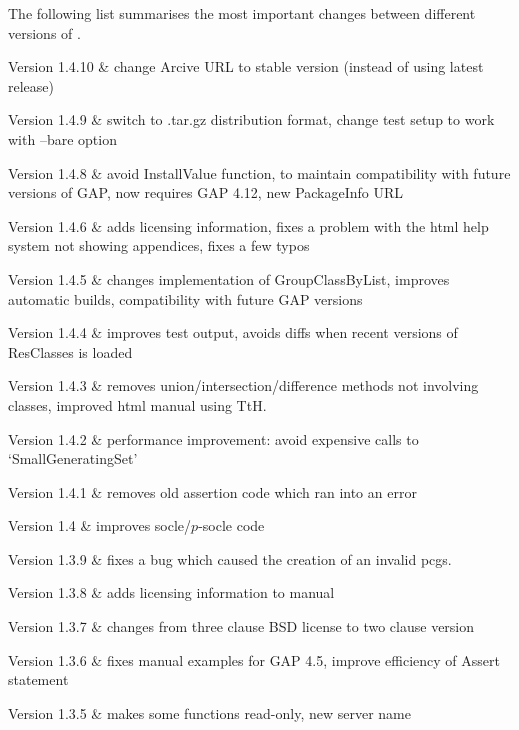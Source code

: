 
The following list summarises the most important changes between different versions of \CRISP.

\beginitems



Version 1.4.10 &
	change Arcive URL to stable version (instead of using latest release)

Version 1.4.9 &
	switch to .tar.gz distribution format, change test setup to work with --bare option

Version 1.4.8 &
	avoid InstallValue function, to maintain compatibility with future versions of GAP, now requires GAP 4.12, new PackageInfo URL

Version 1.4.6 &
	adds licensing information, fixes a problem with the html help system not showing appendices, fixes a few typos
	
Version 1.4.5 &
	changes implementation of GroupClassByList, improves automatic builds, compatibility with future GAP versions
	
Version  1.4.4 &
	improves test output, avoids diffs when recent versions of ResClasses is loaded

Version 1.4.3 &
	removes union/intersection/difference methods not involving classes, improved html manual using TtH.

Version 1.4.2 & 
	performance improvement: avoid expensive calls to `SmallGeneratingSet'
	
Version 1.4.1 &
	removes old assertion code which ran into an error
	
Version 1.4 &
	improves socle/$p$-socle code
	
Version 1.3.9 &
	fixes a bug which caused the creation of an invalid pcgs.
	
Version 1.3.8 &
	adds licensing information to manual
	
Version 1.3.7 &
	changes from three clause BSD license to two clause version
	
Version 1.3.6 & 
	fixes manual examples for GAP 4.5, improve efficiency of Assert statement
	
Version 1.3.5 &
	makes some functions read-only, new server name
	
